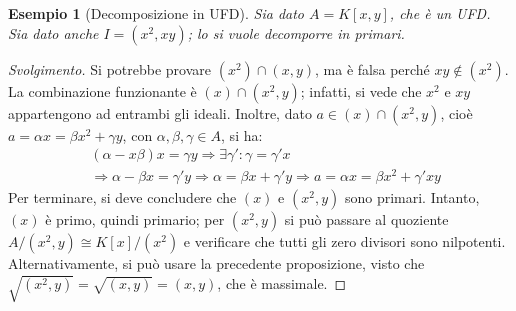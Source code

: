 \documentclass[12pt]{scrartcl}
\theoremstyle{style}
\newtheorem{esempio}{Esempio}[section]
\theoremstyle{style1}
\newenvironment{svolgimento}{\renewcommand\qedsymbol{$\blacksquare$}\begin{proof}[Svolgimento]}{\end{proof}}
\numberwithin{equation}{subsection}
\begin{document}
\begin{esempio}
	[Decomposizione in UFD]
	Sia dato $A = K[x,y]$, che \`e un UFD.
	Sia dato anche $I = (x^2 , xy)$; lo si vuole decomporre in primari.
\end{esempio}
\begin{svolgimento}
Si potrebbe provare $(x^2) \cap (x,y)$, ma \`e falsa perch\'e $xy \not \in (x^2)$.
La combinazione funzionante \`e $(x) \cap (x^2 , y)$; infatti, si vede che $x^2$ e $xy$ appartengono ad entrambi gli ideali.
Inoltre, dato $a \in (x) \cap (x^2 , y)$, cio\`e $a = \alpha x = \beta x^2 + \gamma y$, con $\alpha ,\beta ,\gamma \in A$, si ha:
\[
\begin{split}
	&(\alpha -x\beta )x = \gamma y \Rightarrow \exists \gamma' : \gamma = \gamma' x \\
	&\Rightarrow \alpha -\beta x = \gamma'y \Rightarrow \alpha  = \beta x + \gamma'y \Rightarrow a = \alpha x = \beta x^2 + \gamma' xy
\end{split}
\] 
Per terminare, si deve concludere che $(x)$ e $(x^2 ,y) $ sono primari.
Intanto, $(x)$ \`e primo, quindi primario; per $(x^2,y)$ si pu\`o passare al quoziente $A / (x^2 ,y) \cong K [x] / (x^2)$ e verificare che tutti gli zero divisori sono nilpotenti.
Alternativamente, si pu\`o usare la precedente proposizione, visto che $\sqrt{(x^2,y)} = \sqrt{(x,y)} =(x,y)$, che \`e massimale.
\end{svolgimento}
\end{document}
